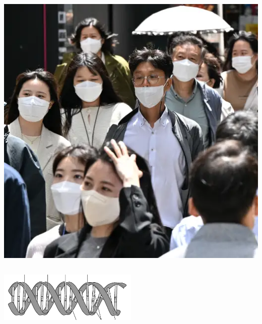 \documentclass{beamer}
\begin{document}
\begin{frame}
\begin{columns}
\begin{column}{0.5\textwidth}
        \includegraphics[width=\textwidth]{figures/covid.png}
        \end{column}
    \end{columns}
    \begin{center}
    \includegraphics[width=0.5\textwidth]{figures/dna.png}
    \end{center}
\end{frame}
\end{document}

